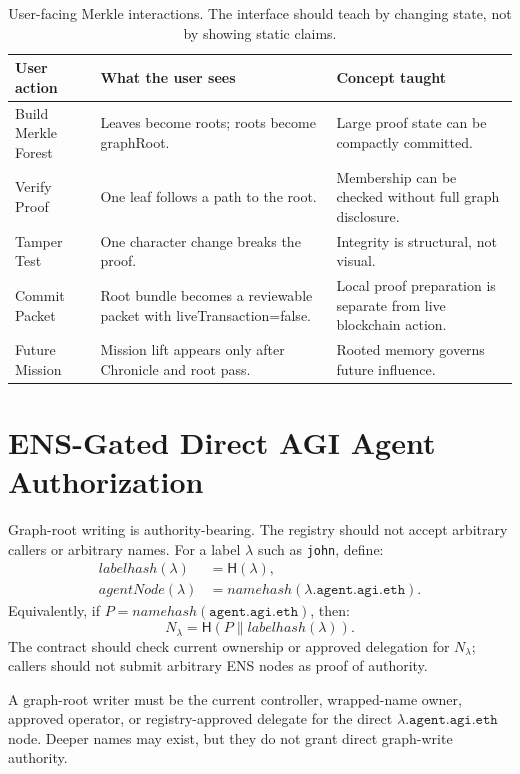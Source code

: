 \documentclass[11pt,letterpaper]{article}
\newcommand{\hash}{\mathsf{H}}
\begin{document}
\begin{table}[H]
\small
\centering
\begin{tabularx}{\textwidth}{p{1.5in}Y Y}
\toprule
User action & What the user sees & Concept taught \\
\midrule
Build Merkle Forest & Leaves become roots; roots become graphRoot. & Large proof state can be compactly committed. \\
Verify Proof & One leaf follows a path to the root. & Membership can be checked without full graph disclosure. \\
Tamper Test & One character change breaks the proof. & Integrity is structural, not visual. \\
Commit Packet & Root bundle becomes a reviewable packet with liveTransaction=false. & Local proof preparation is separate from live blockchain action. \\
Future Mission & Mission lift appears only after Chronicle and root pass. & Rooted memory governs future influence. \\
\bottomrule
\end{tabularx}
\caption{User-facing Merkle interactions. The interface should teach by changing state, not by showing static claims.}
\end{table}

\section{ENS-Gated Direct AGI Agent Authorization}
Graph-root writing is authority-bearing. The registry should not accept arbitrary callers or arbitrary names. For a label $\lambda$ such as \texttt{john}, define:
\begin{align}
labelhash(\lambda)&=\hash(\lambda),\\
agentNode(\lambda)&=namehash(\lambda.\texttt{agent.agi.eth}).
\end{align}
Equivalently, if $P=namehash(\texttt{agent.agi.eth})$, then:
\begin{equation}
N_\lambda=\hash(P \parallel labelhash(\lambda)).\label{eq:agentnode}
\end{equation}
The contract should check current ownership or approved delegation for $N_\lambda$; callers should not submit arbitrary ENS nodes as proof of authority.

\begin{lawbox}
A graph-root writer must be the current controller, wrapped-name owner, approved operator, or registry-approved delegate for the direct $\lambda.\texttt{agent.agi.eth}$ node. Deeper names may exist, but they do not grant direct graph-write authority.
\end{lawbox}
\end{document}
